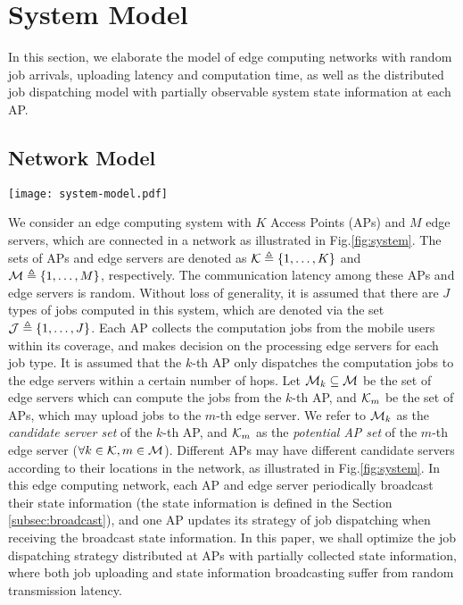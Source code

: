 \section{System Model}
\label{sec:model}
In this section, we elaborate the model of edge computing networks with random job arrivals, uploading latency and computation time, as well as the distributed job dispatching model with partially observable system state information at each AP.
\subsection{Network Model}
\begin{figure*}[htp!]
    \centering
    \texttt{[image: system-model.pdf]}
    \caption{The Illustration of System Model}
    \label{fig:system}
\end{figure*}

We consider an edge computing system with $K$ Access Points (APs) and $M$ edge servers, which are connected in a network as illustrated in Fig.\ref{fig:system}.
The sets of APs and edge servers are denoted as $\mathcal{K} \triangleq \{1,\dots,K\}$ and $\mathcal{M} \triangleq \{1,\dots,M\}$, respectively.
The communication latency among these APs and edge servers is random.
Without loss of generality, it is assumed that there are $J$ types of jobs computed in this system, which are denoted via the set $\mathcal{J} \triangleq \{1,\dots,J\}$.
Each AP collects the computation jobs from the mobile users within its coverage, and makes decision on the processing edge servers for each job type.
It is assumed that the $k$-th AP only dispatches the computation jobs to the edge servers within a certain number of hops.
Let $\mathcal{M}_{k} \subseteq \mathcal{M}$ be the set of edge servers which can compute the jobs from the $k$-th AP, and $\mathcal{K}_{m}$ be the set of APs, which may upload jobs to the $m$-th edge server.
We refer to $\mathcal{M}_{k}$ as the \emph{candidate server set} of the $k$-th AP, and $\mathcal{K}_{m}$ as the \emph{potential AP set} of the $m$-th edge server ($\forall k\in\mathcal{K}, m\in\mathcal{M}$).
Different APs may have different candidate servers according to their locations in the network, as illustrated in Fig.\ref{fig:system}.
In this edge computing network, each AP and edge server periodically broadcast their state information (the state information is defined in the Section \ref{subsec:broadcast}), and one AP updates its strategy of job dispatching when receiving the broadcast state information.
In this paper, we shall optimize the job dispatching strategy distributed at APs with partially collected state information{, where both job uploading and state information broadcasting suffer from random transmission latency.}

